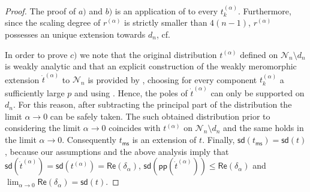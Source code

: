 \documentclass[11pt]{book}
\newcommand{\pp}{\mathsf{pp}}
\newcommand{\ms}{\mathsf{ms}}
\newcommand{\sd}{\mathsf{sd}}
\renewcommand{\Re}{\mathsf{Re}}
\newcommand{\Ncal}{\mathcal{N}}
\theoremstyle{break}
\begin{document}
\begin{proof}
The proof of $a)$ and $b)$ is an application of %
to every $t^{(\alpha)}_k$. Furthermore, since the scaling degree of $r^{(\alpha)}$ is strictly smaller than $4(n-1)$, $r^{(\alpha)}$ possesses an unique extension towards $d_n$, cf. %

\bigskip

In order to prove $c)$ we note that the original distribution $t^{(\alpha)}$ defined on $\Ncal_n\setminus d_n$ is weakly analytic and that an explicit construction of the weakly meromorphic extension $\dot{t}^{(\alpha)}$ to $\Ncal_n$ is provided by 
, choosing for every component $t^{(\alpha)}_k$ a sufficiently large $p$ and using %
. Hence, the poles of $\dot{t}^{(\alpha)}$ can only be supported on $d_n$. For this reason, after subtracting the principal part of the distribution the limit $\alpha \to 0$ can be safely taken. The such obtained distribution prior to considering the limit $\alpha \to 0$ coincides with $t^{(\alpha)}$ on $\Ncal_n\setminus d_n$ and the same holds in the limit $\alpha\to 0$. Consequently $t_\ms$ is an extension of $t$. Finally, $\sd(t_\ms)=\sd(t)$, because our assumptions and the above analysis imply that $\sd(\dot{t}^{(\alpha)})=\sd(t^{(\alpha)})=\Re(\delta_\alpha)$, $\sd(\pp(\dot{t}^{(\alpha)}))\le \Re(\delta_\alpha)$ and $\lim_{\alpha\to 0}\Re(\delta_\alpha) = \sd(t)$.
\end{proof}
\end{document}
